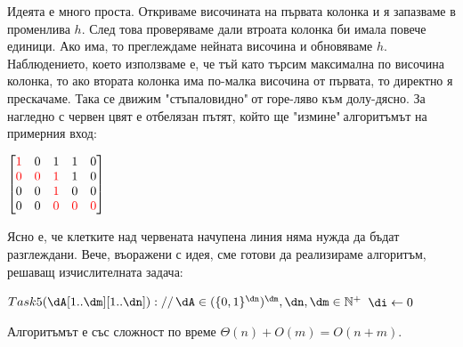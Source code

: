 \begin{solution}
	Идеята е много проста. Откриваме височината на първата колонка и я запазваме в променлива $h$. След това проверяваме дали втроата колонка би имала повече единици. Ако има, то преглеждаме нейната височина и обновяваме $h$. Наблюдението, което използваме е, че тъй като търсим максимална по височина колонка, то ако втората колонка има по-малка височина от първата, то директно я прескачаме. Така се движим "стъпаловидно"$\ $от горе-ляво към долу-дясно. За нагледно с червен цвят е отбелязан пътят, който ще "измине"$\ $алгоритъмът на примерния вход:
	\begin{center}
		$\begin{bmatrix}
			\textcolor{red}1 & 0 & 1 & 1 & 0\\
			\textcolor{red}0 & \textcolor{red}0 & \textcolor{red}1 & 1 & 0\\
			0 & 0 & \textcolor{red}1 & 0 & 0\\
			0 & 0 & \textcolor{red}0 & \textcolor{red}0 & \textcolor{red}0
		\end{bmatrix}$
	\end{center}
	Ясно е, че клетките над червената начупена линия няма нужда да бъдат разглеждани. Вече, въоражени с идея, сме готови да реализираме алгоритъм, решаващ изчислителната задача:
	\begin{pseudocode}
		
		$Task5(\dA[1..\dm][1..\dn])://\,\dA\in(\{0,1\}^{\dn})^{\dm},\dn,\dm\in\mathbb{N}^+$
		\Mybegin
		{	
			$\di\leftarrow0$\;
			{
			}
			\KwRet{$\di$\;}
		}
	\end{pseudocode}
	Алгоритъмът е със сложност по време $\Theta(n)+O(m)=O(n+m)$.
\end{solution}\vspace{0.35cm}

